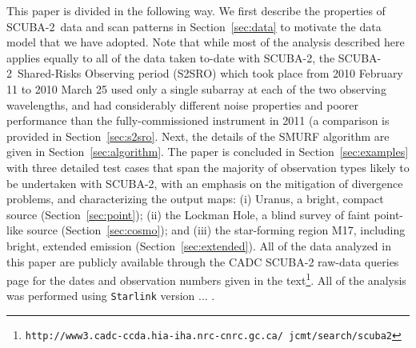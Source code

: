 \documentclass[useAMS,usenatbib,nofootinbib]{mn2e}
\newcommand{\scuba}{SCUBA-2}
\begin{document}
This paper is divided in the following way. We first describe the
properties of \scuba\ data and scan patterns in Section~\ref{sec:data}
to motivate the data model that we have adopted. Note that while most
of the analysis described here applies equally to all of the data
taken to-date with \scuba, the \scuba\ Shared-Risks Observing period
(S2SRO) which took place from 2010 February 11 to 2010 March 25 used
only a single subarray at each of the two observing wavelengths, and
had considerably different noise properties and poorer performance
than the fully-commissioned instrument in 2011 (a comparison is
provided in Section~\ref{sec:s2sro}. Next, the details of the SMURF
algorithm are given in Section~\ref{sec:algorithm}. The paper is
concluded in Section~\ref{sec:examples} with three detailed test cases
that span the majority of observation types likely to be undertaken
with \scuba, with an emphasis on the mitigation of divergence
problems, and characterizing the output maps: (i) Uranus, a bright,
compact source (Section~\ref{sec:point}); (ii) the Lockman Hole, a
blind survey of faint point-like source (Section~\ref{sec:cosmo}); and
(iii) the star-forming region M17, including bright, extended emission
(Section~\ref{sec:extended}). All of the data analyzed in this paper
are publicly available through the CADC SCUBA-2 raw-data queries page
for the dates and observation numbers given in the
text\footnote{\texttt{http://www3.cadc-ccda.hia-iha.nrc-cnrc.gc.ca/
jcmt/search/scuba2}}. All of the analysis was performed using
\texttt{Starlink} version ... .






\end{document}
